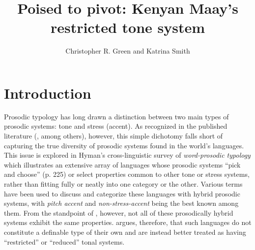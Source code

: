 \documentclass[output=paper,colorlinks,citecolor=brown]{langscibook}
\author{Christopher R. Green\affiliation{Syracuse University} and Katrina Smith\affiliation{University of Florida}}
\title{Poised to pivot: Kenyan Maay's restricted tone system}
\begin{document}
\maketitle

\section{Introduction}

Prosodic typology  has long drawn a distinction between two main types of proso\-dic systems: tone and stress (accent). As recognized in the published literature (\citealt{Beckman1986,Hyman2009, McCawley1970, McCawley1978, Mous2021,vdH2011}, among others), however, this simple dichotomy falls short of capturing the true diversity of prosodic systems found in the world's languages. This issue is explored in Hyman's \citeyearpar{Hyman2006} cross-linguistic survey of \textit{word-prosodic typology} which illustrates an extensive array of languages whose prosodic systems ``pick and choose'' (p. 225) or select properties common to other tone or stress systems, rather than fitting fully or neatly into one category or the other. Various terms have been used to discuss and categorize these languages with hybrid prosodic systems, with \textit{pitch accent} and \textit{non-stress-accent} \citep{Beckman1986} being the best known among them. From the standpoint of , however, not all of these prosodically hybrid systems exhibit the same properties. \citet{Hyman2009} argues, therefore, that such languages do not constitute a definable type of their own and are instead better treated as having ``restricted'' or ``reduced'' tonal systems. 
\end{document}
